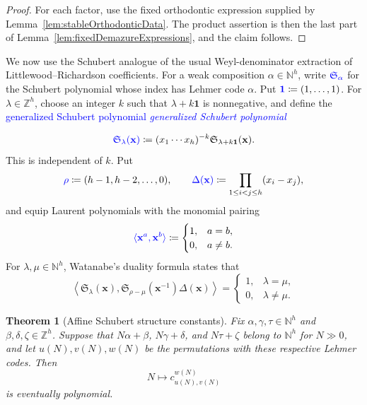 \documentclass[11pt,reqno]{amsart}
\newtheorem{theorem}{Theorem}[section]
\theoremstyle{definition}
\newcommand{\setN}{\mathbb{N}}
\newcommand{\setZ}{\mathbb{Z}}
\newcommand{\xvec}{\mathbf{x}}
\newcommand{\schubertS}{\mathfrak{S}}
\newcommand{\defin}[1]{%
  \relax\ifmmode%
  \textcolor{blue}{#1}%
  \else\textcolor{blue}{\emph{#1}}%
  \fi%
}
\begin{document}
\begin{proof}
For each factor, use the fixed orthodontic expression supplied by
Lemma~\ref{lem:stableOrthodonticData}.  The product assertion is then the last
part of Lemma~\ref{lem:fixedDemazureExpressions}, and the claim follows.
\end{proof}

We now use the Schubert analogue of the usual Weyl-denominator extraction of
Littlewood--Richardson coefficients.  For a weak composition
\(\alpha\in\setN^h\), write \(\defin{\schubertS_\alpha}\) for the Schubert polynomial
whose index has Lehmer code \(\alpha\).  Put
\(\defin{\mathbf 1}\coloneqq(1,\dotsc,1)\).  For \(\lambda\in\setZ^h\), choose an integer
\(k\) such that \(\lambda+k\mathbf 1\) is nonnegative, and define the
\defin{generalized Schubert polynomial}
\[
\defin{\schubertS_\lambda(\xvec)}
\coloneqq
(x_1\dotsm x_h)^{-k}\schubertS_{\lambda+k\mathbf 1}(\xvec).
\]
This is independent of \(k\).  Put
\[
\defin{\rho}\coloneqq(h-1,h-2,\dotsc,0),
\qquad
\defin{\Delta(\xvec)}\coloneqq\prod_{1\leq i<j\leq h}(x_i-x_j),
\]
and equip Laurent polynomials with the monomial pairing
\[
\defin{\langle\xvec^a,\xvec^b\rangle}
\coloneqq
\begin{cases}
1,& a=b,\\
0,& a\neq b.
\end{cases}
\]
For \(\lambda,\mu\in\setN^h\), Watanabe's duality formula
\cite[Lem.~7.4]{Watanabe2016} states that
\begin{equation}
\label{eq:watanabeDuality}
\left\langle
\schubertS_\lambda(\xvec),
\schubertS_{\rho-\mu}(\xvec^{-1})\Delta(\xvec)
\right\rangle
=
\begin{cases}
1,& \lambda=\mu,\\
0,& \lambda\neq\mu.
\end{cases}
\end{equation}

\begin{theorem}[Affine Schubert structure constants]
\label{thm:affineSchubertStructureConstants}
Fix \(\alpha,\gamma,\tau\in\setN^h\) and
\(\beta,\delta,\zeta\in\setZ^h\).  Suppose that
\(N\alpha+\beta\), \(N\gamma+\delta\), and \(N\tau+\zeta\) belong to
\(\setN^h\) for \(N\gg0\), and let \(u(N),v(N),w(N)\) be the permutations
with these respective Lehmer codes.  Then
\[
N\longmapsto c_{u(N),v(N)}^{w(N)}
\]
is eventually polynomial.
\end{theorem}
\end{document}
